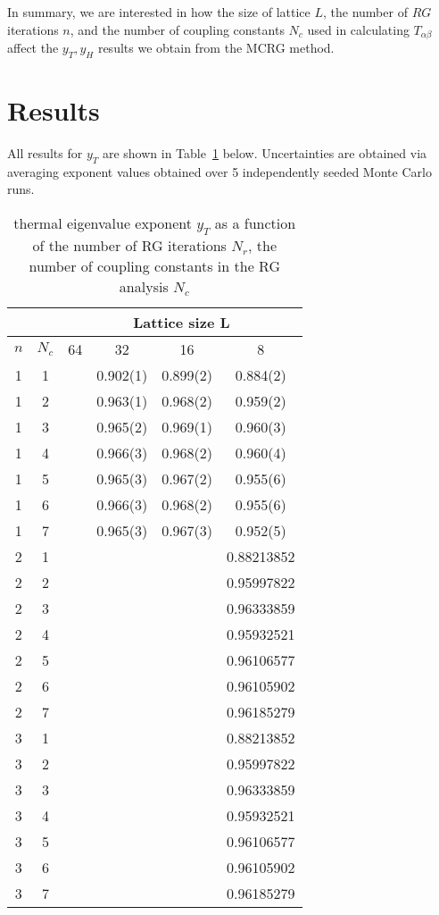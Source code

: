 \documentclass{article}
\begin{document}
In summary, we are interested in how the size of lattice $L$, the number of $RG$ iterations $n$, and the number of coupling constants $N_c$ used in calculating $T_{\alpha\beta}$ affect the $y_T, y_H$ results we obtain from the MCRG method.

\section{Results}
All results for $y_T$ are shown in Table~\ref{yT} below. Uncertainties are obtained via averaging exponent values obtained over 5 independently seeded Monte Carlo runs.
\begin{table}[H]
\centering
\begin{tabular}{|c|c|c|c|c|c|} 
\hline
 \multicolumn{2}{|c|}{ }& \multicolumn{4}{c|}{Lattice size L}\\
 \hline
 $n$ & $N_c$ & 64 & 32 & 16 & 8 \\
 \hline
 1 & 1 & & 0.902(1)& 0.899(2) & 0.884(2)\\
 1 & 2 & & 0.963(1) & 0.968(2)& 0.959(2)\\
 1 & 3 & & 0.965(2)& 0.969(1) & 0.960(3)\\
 1 & 4 & & 0.966(3) & 0.968(2) & 0.960(4)\\
 1 & 5 & & 0.965(3) & 0.967(2) & 0.955(6)\\
 1 & 6 & & 0.966(3) & 0.968(2) & 0.955(6)\\
 1 & 7 & & 0.965(3) & 0.967(3) & 0.952(5)\\
 \hline
 2 & 1 & & & & 0.88213852\\
 2 & 2 & & & & 0.95997822\\
 2 & 3 & & & & 0.96333859\\
 2 & 4 & & & & 0.95932521\\
 2 & 5 & & & & 0.96106577\\
 2 & 6 & & & & 0.96105902\\
 2 & 7 & & & & 0.96185279\\
 \hline
 3 & 1 & & & & 0.88213852\\
 3 & 2 & & & & 0.95997822\\
 3 & 3 & & & & 0.96333859\\
 3 & 4 & & & & 0.95932521\\
 3 & 5 & & & & 0.96106577\\
 3 & 6 & & & & 0.96105902\\
 3 & 7 & & & & 0.96185279\\
 \hline
 \end{tabular}
 \caption{\label{yT}thermal eigenvalue
exponent $y_T$ as a function of the number of RG iterations $N_r$, the number of coupling
constants in the RG analysis $N_c$}
\end{table}
\end{document}
